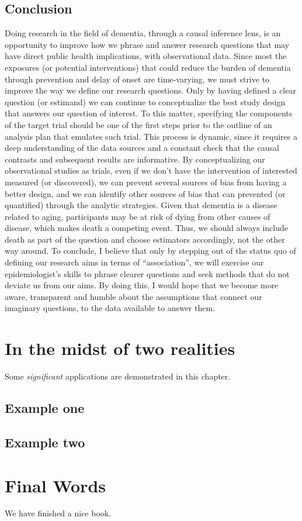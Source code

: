 \documentclass[
]{book}
\begin{document}
\hypertarget{conclusion}{%
\section{Conclusion}\label{conclusion}}

Doing research in the field of dementia, through a causal inference lens, is an opportunity to improve how we phrase and answer research questions that may have direct public health implications, with observational data. Since most the exposures (or potential interventions) that could reduce the burden of dementia through prevention and delay of onset are time-varying, we must strive to improve the way we define our research questions. Only by having defined a clear question (or estimand) we can continue to conceptualize the best study design that answers our question of interest. To this matter, specifying the components of the target trial should be one of the first steps prior to the outline of an analysis plan that emulates such trial. This process is dynamic, since it requires a deep understanding of the data sources and a constant check that the causal contrasts and subsequent results are informative. By conceptualizing our observational studies as trials, even if we don't have the intervention of interested measured (or discovered), we can prevent several sources of bias from having a better design, and we can identify other sources of bias that can prevented (or quantified) through the analytic strategies. Given that dementia is a disease related to aging, participants may be at risk of dying from other causes of disease, which makes death a competing event. Thus, we should always include death as part of the question and choose estimators accordingly, not the other way around. To conclude, I believe that only by stepping out of the status quo of defining our research aims in terms of ``association'', we will exercise our epidemiologist's skills to phrase clearer questions and seek methods that do not deviate us from our aims. By doing this, I would hope that we become more aware, transparent and humble about the assumptions that connect our imaginary questions, to the data available to answer them.

\hypertarget{chapter8}{%
\chapter{In the midst of two realities}\label{chapter8}}

Some \emph{significant} applications are demonstrated in this chapter.

\hypertarget{example-one}{%
\section{Example one}\label{example-one}}

\hypertarget{example-two}{%
\section{Example two}\label{example-two}}

\hypertarget{chapter10}{%
\chapter{Final Words}\label{chapter10}}

We have finished a nice book.

\printbibliography
\end{document}
